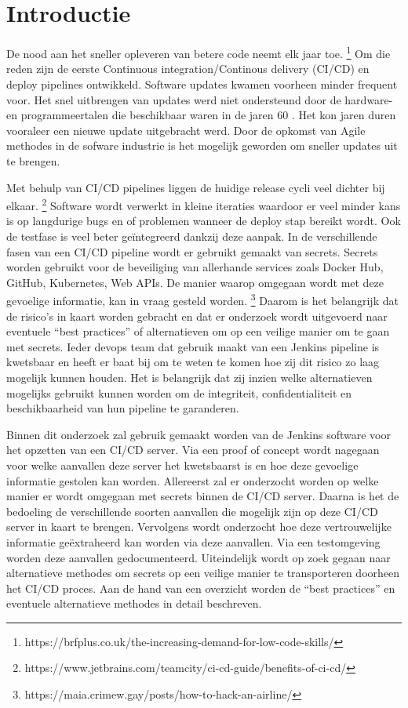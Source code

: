 
\section{Introductie}%
\label{sec:introductie}

De nood aan het sneller opleveren van betere code neemt elk jaar toe. \footnote{https://brfplus.co.uk/the-increasing-demand-for-low-code-skills/} Om die reden zijn de eerste Continuous integration/Continous delivery (CI/CD) en deploy pipelines ontwikkeld. Software updates kwamen voorheen minder frequent voor. Het snel uitbrengen van updates werd niet ondersteund door de hardware- en programmeertalen die beschikbaar waren in de jaren 60 \autocite{Jiang2009}. Het kon jaren duren vooraleer een nieuwe update uitgebracht werd. Door de opkomst van Agile methodes in de sofware industrie is het mogelijk geworden om sneller updates uit te brengen. 

Met behulp van CI/CD pipelines liggen de huidige release cycli veel dichter bij elkaar. \footnote{https://www.jetbrains.com/teamcity/ci-cd-guide/benefits-of-ci-cd/} Software wordt verwerkt in kleine iteraties waardoor er veel minder kans is op langdurige bugs en of problemen wanneer de deploy stap bereikt wordt. Ook de testfase is veel beter geïntegreerd dankzij deze aanpak. In de verschillende fasen van een CI/CD pipeline wordt er gebruikt gemaakt van secrets. Secrets worden gebruikt voor de beveiliging van allerhande services zoals Docker Hub, GitHub, Kubernetes, Web APIs. De manier waarop omgegaan wordt met deze gevoelige informatie, kan in vraag gesteld worden. \footnote{https://maia.crimew.gay/posts/how-to-hack-an-airline/} Daarom is het belangrijk dat de risico’s in kaart worden gebracht en dat er onderzoek wordt uitgevoerd naar eventuele “best practices” of alternatieven om op een veilige manier om te gaan met secrets. Ieder devops team dat gebruik maakt van een Jenkins pipeline is kwetsbaar en heeft er baat bij om te weten te komen hoe zij dit risico zo laag mogelijk kunnen houden. Het is belangrijk dat zij inzien welke alternatieven mogelijks gebruikt kunnen worden om de integriteit, confidentialiteit en beschikbaarheid van hun pipeline te garanderen.  

Binnen dit onderzoek zal gebruik gemaakt worden van de Jenkins software voor het opzetten van een CI/CD server. Via een proof of concept wordt nagegaan voor welke aanvallen deze server het kwetsbaarst is en hoe deze gevoelige informatie gestolen kan worden. Allereerst zal er onderzocht worden op welke manier er wordt omgegaan met secrets binnen de CI/CD server. Daarna is het de bedoeling de verschillende soorten aanvallen die mogelijk zijn op deze CI/CD server in kaart te brengen. Vervolgens wordt onderzocht hoe deze vertrouwelijke informatie geëxtraheerd kan worden via deze aanvallen. Via een testomgeving worden deze aanvallen gedocumenteerd. Uiteindelijk wordt op zoek gegaan naar alternatieve methodes om secrets op een veilige manier te transporteren doorheen het CI/CD proces. Aan de hand van een overzicht worden de “best practices” en eventuele alternatieve methodes in detail beschreven.

